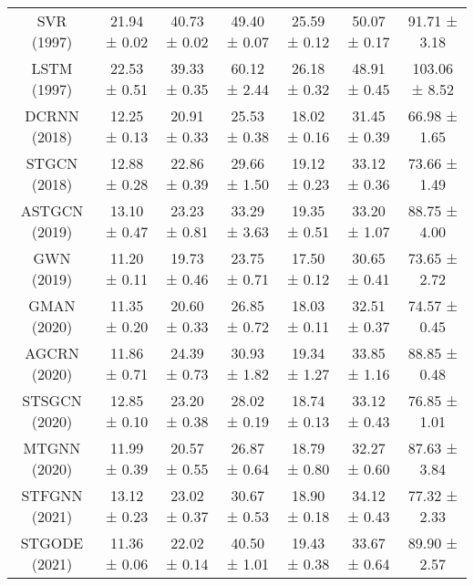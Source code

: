 \documentclass[sn-mathphys,iicol]{sn-jnl}
\theoremstyle{thmstyleone}\newtheorem{theorem}{Theorem}\newtheorem{proposition}[theorem]{Proposition}
\theoremstyle{thmstyletwo}\newtheorem{example}{Example}\newtheorem{remark}{Remark}
\theoremstyle{thmstylethree}\newtheorem{definition}{Definition}
\begin{document}
\begin{table*}[!h]
{\begin{tabular}{c|ccc|ccc}
SVR (1997)                      & 21.94 ± 0.02          & 40.73 ± 0.02          & 49.40 ± 0.07          & 25.59 ± 0.12          & 50.07 ± 0.17          & 91.71 ± 3.18          \\
LSTM (1997)                     & 22.53 ± 0.51          & 39.33 ± 0.35          & 60.12 ± 2.44          & 26.18 ± 0.32          & 48.91 ± 0.45          & 103.06 ± 8.52         \\
DCRNN (2018)                    & 12.25 ± 0.13          & 20.91 ± 0.33          & 25.53 ± 0.38          & 18.02 ± 0.16          & 31.45 ± 0.39          & 66.98 ± 1.65          \\
STGCN (2018)                    & 12.88 ± 0.28          & 22.86 ± 0.39          & 29.66 ± 1.50          & 19.12 ± 0.23          & 33.12 ± 0.36          & 73.66 ± 1.49          \\
ASTGCN (2019)                   & 13.10 ± 0.47          & 23.23 ± 0.81          & 33.29 ± 3.63          & 19.35 ± 0.51          & 33.20 ± 1.07          & 88.75 ± 4.00          \\
GWN (2019)                      & 11.20 ± 0.11          & 19.73 ± 0.46          & 23.75 ± 0.71          & 17.50 ± 0.12          & 30.65 ± 0.41          & 73.65 ± 2.72          \\
GMAN (2020)                     & 11.35 ± 0.20          & 20.60 ± 0.33          & 26.85 ± 0.72          & 18.03 ± 0.11          & 32.51 ± 0.37          & 74.57 ± 0.45          \\
AGCRN (2020)                    & 11.86 ± 0.71          & 24.39 ± 0.73          & 30.93 ± 1.82          & 19.34 ± 1.27          & 33.85 ± 1.16          & 88.85 ± 0.48          \\
STSGCN (2020)                   & 12.85 ± 0.10          & 23.20 ± 0.38          & 28.02 ± 0.19          & 18.74 ± 0.13          & 33.12 ± 0.43          & 76.85 ± 1.01          \\
MTGNN (2020)                    & 11.99 ± 0.39          & 20.57 ± 0.55          & 26.87 ± 0.64          & 18.79 ± 0.80          & 32.27 ± 0.60          & 87.63 ± 3.84          \\
STFGNN (2021)                   & 13.12 ± 0.23          & 23.02 ± 0.37          & 30.67 ± 0.53          & 18.90 ± 0.18          & 34.12 ± 0.43          & 77.32 ± 2.33          \\
STGODE (2021)                   & 11.36 ± 0.06          & 22.02 ± 0.14          & 40.50 ± 1.01          & 19.43 ± 0.38          & 33.67 ± 0.64          & 89.90 ± 2.57          \\

\end{tabular}}
\end{table*}
\end{document}
